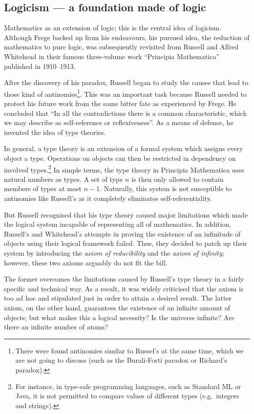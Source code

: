 \documentclass[hidelinks]{article}
\begin{document}
\subsection{Logicism --- a foundation made of logic}\label{ssec_logicism}
Mathematics as an extension of logic; this is the central idea of logicism. Although Frege backed up from his endeavours, his pursued idea, the reduction of mathematics to pure logic, was subsequently revisited from Russell and Alfred Whitehead in their famous three-volume work ``Principia Mathematica'' published in 1910--1913.

After the discovery of his paradox, Russell began to study the causes that lead to those kind of antinomies\footnote{There were found antinomies similar to Russel's at the same time, which we are not going to discuss (such as the Burali-Forti paradox or Richard's paradox).\cite{russell_self_referentiality}}. This was an important task because Russell needed to protect his future work from the same bitter fate as experienced by Frege. He concluded that ``In all the contradictions there is a common characteristic, which we may describe as self-reference or reflexiveness''\cite[p. 224]{russell_self_referentiality}. As a means of defence, he invented the idea of type theories. 

In general, a type theory is an extension of a formal system which assigns every object a type. Operations on objects can then be restricted in dependency on involved types.\footnote{For instance, in type-safe programming languages, such as Standard ML or Java, it is not permitted to compare values of different types (e.g.\ integers and strings).} In simple terms, the type theory in Principia Mathematica uses natural numbers as types. A set of type $n$ is then only allowed to contain members of types at most $n-1$. Naturally, this system is not susceptible to antinomies like Russell's as it completely eliminates self-referentiality. 

But Russell recognised that his type theory caused major limitations which made the logical system incapable of representing all of mathematics. In addition, Russell's and Whitehead's attempts in proving the existence of an infinitude of objects using their logical framework failed. Thus, they decided to patch up their system by introducing the \textit{axiom of reducibility} and the \textit{axiom of infinity}; however, these two axioms arguably do not fit the bill.

The former overcomes the limitations caused by Russell's type theory in a fairly specific and technical way. As a result, it was widely criticised that the axiom is too ad hoc and stipulated just in order to attain a desired result.
The latter axiom, on the other hand, guarantees the existence of an infinite amount of objects; but what makes this a logical necessity? Is the universe infinite? Are there an infinite number of atoms?
\end{document}
